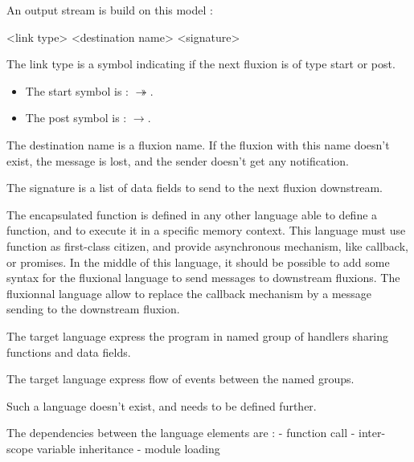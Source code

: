 An output stream is build on this model :
\begin{code}
<link type> <destination name> <signature>
\end{code}

The link type is a symbol indicating if the next fluxion is of type start or post.
\begin{itemize}
  \item The start symbol is : $\twoheadrightarrow$.
  \item The post symbol is : $\rightarrow$.
\end{itemize}

The destination name is a fluxion name.
If the fluxion with this name doesn't exist, the message is lost, and the sender doesn't get any notification.

The signature is a list of data fields to send to the next fluxion downstream.

The encapsulated function is defined in any other language able to define a function, and to execute it in a specific memory context.
This language must use function as first-class citizen, and provide asynchronous mechanism, like callback, or promises.
In the middle of this language, it should be possible to add some syntax for the fluxional language to send messages to downstream fluxions.
The fluxionnal language allow to replace the callback mechanism by a message sending to the downstream fluxion.












The target language express the program in named group of handlers sharing functions and data fields.

The target language express flow of events between the named groups.

Such a language doesn't exist, and needs to be defined further.


The dependencies between the language elements are :
- function call
- inter-scope variable inheritance
- module loading
























